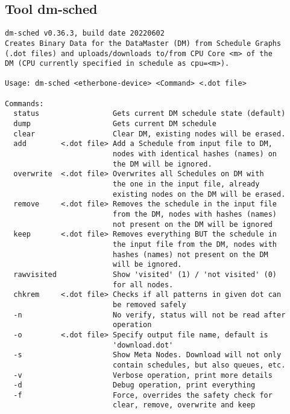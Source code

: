 \subsection{Tool dm-sched}
\label{Tool_dm-sched}
\begin{lstlisting}[style = helptext]
dm-sched v0.36.3, build date 20220602
Creates Binary Data for the DataMaster (DM) from Schedule Graphs
(.dot files) and uploads/downloads to/from CPU Core <m> of the
DM (CPU currently specified in schedule as cpu=<m>).

Usage: dm-sched <etherbone-device> <Command> <.dot file>

Commands:
  status                 Gets current DM schedule state (default)
  dump                   Gets current DM schedule
  clear                  Clear DM, existing nodes will be erased.
  add        <.dot file> Add a Schedule from input file to DM,
                         nodes with identical hashes (names) on
                         the DM will be ignored.
  overwrite  <.dot file> Overwrites all Schedules on DM with
                         the one in the input file, already
                         existing nodes on the DM will be erased.
  remove     <.dot file> Removes the schedule in the input file
                         from the DM, nodes with hashes (names)
                         not present on the DM will be ignored
  keep       <.dot file> Removes everything BUT the schedule in
                         the input file from the DM, nodes with
                         hashes (names) not present on the DM
                         will be ignored.
  rawvisited             Show 'visited' (1) / 'not visited' (0)
                         for all nodes.
  chkrem     <.dot file> Checks if all patterns in given dot can
                         be removed safely
  -n                     No verify, status will not be read after
                         operation
  -o         <.dot file> Specify output file name, default is
                         'download.dot'
  -s                     Show Meta Nodes. Download will not only
                         contain schedules, but also queues, etc.
  -v                     Verbose operation, print more details
  -d                     Debug operation, print everything
  -f                     Force, overrides the safety check for
                         clear, remove, overwrite and keep
\end{lstlisting}
